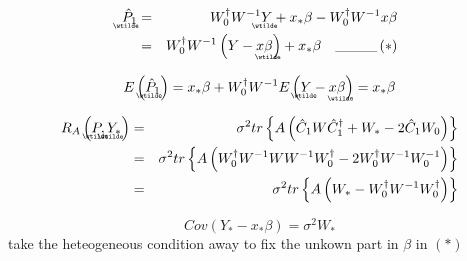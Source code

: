 \documentclass{article}
\begin{document}
\begin{eqnarray*}
\underaccent{\wtilde}{\hat{P}}%
_{1} &=&W_{0}^{\dagger }W^{-1}%
\underaccent{\wtilde}{Y}%
+x_{\ast }\beta -W_{0}^{\dagger }W^{-1}x\beta \\
&=&W_{0}^{\dagger }W^{-1}\left( Y-x%
\underaccent{\wtilde}{\beta}%
\right) +x_{\ast }\beta \quad \_\_\_\_\left( \ast \right)
\end{eqnarray*}

\begin{equation*}
E\left( 
\underaccent{\wtilde}{\hat{P}}%
_{1}\right) =x_{\ast }\beta +W_{0}^{\dagger }W^{-1}E\left( 
\underaccent{\wtilde}{Y}%
-x%
\underaccent{\wtilde}{\beta}%
\right) =x_{\ast }\beta
\end{equation*}

\begin{eqnarray*}
R_{A}\left( 
\underaccent{\wtilde}{P}%
,%
\underaccent{\wtilde}{Y}%
_{\ast }\right) &=&\sigma ^{2}tr\left\{ A\left( \hat{C}_{1}W\hat{C}%
_{1}^{\dagger }+W_{\ast }-2\hat{C}_{1}W_{0}\right) \right\} \\
&=&\sigma ^{2}tr\left\{ A\left( W_{0}^{\dagger }W^{-1}WW^{-1}W_{0}^{\dagger
}-2W_{0}^{\dagger }W^{-1}W_{0}^{-1}\right) \right\} \\
&=&\sigma ^{2}tr\left\{ A\left( W_{\ast }-W_{0}^{\dagger
}W^{-1}W_{0}^{\dagger }\right) \right\}
\end{eqnarray*}

\begin{equation*}
Cov\left( Y_{\ast }-x_{\ast }\beta \right) =\sigma ^{2}W_{\ast }
\end{equation*}%
take the heteogeneous condition away to fix the unkown part in $\beta $ in $%
\left( \ast \right) $

\bigskip
\end{document}
